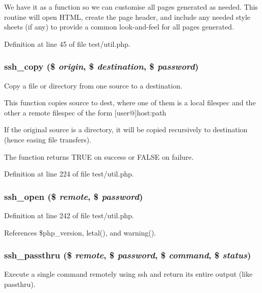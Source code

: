 We have it as a function so we can customise all pages generated as needed. This routine will open HTML, create the page header, and include any needed style sheets (if any) to provide a common look-and-feel for all pages generated. 

Definition at line 45 of file test/util.php.
\subsubsection{\setlength{\rightskip}{0pt plus 5cm}ssh\_\-copy (\$ {\em origin}, \$ {\em destination}, \$ {\em password})}\label{test_2util_8php_a6}


Copy a file or directory from one source to a destination. 

This function copies source to dest, where one of them is a local filespec and the other a remote filespec of the form [user@]host:path

If the original source is a directory, it will be copied recursively to destination (hence easing file transfers).

The function returns TRUE on success or FALSE on failure. 

Definition at line 224 of file test/util.php.
\subsubsection{\setlength{\rightskip}{0pt plus 5cm}ssh\_\-open (\$ {\em remote}, \$ {\em password})}\label{test_2util_8php_a7}




Definition at line 242 of file test/util.php.

References \$php\_\-version, letal(), and warning().
\subsubsection{\setlength{\rightskip}{0pt plus 5cm}ssh\_\-passthru (\$ {\em remote}, \$ {\em password}, \$ {\em command}, \$ {\em status})}\label{test_2util_8php_a5}


Execute a single command remotely using ssh and return its entire output (like passthru). 

